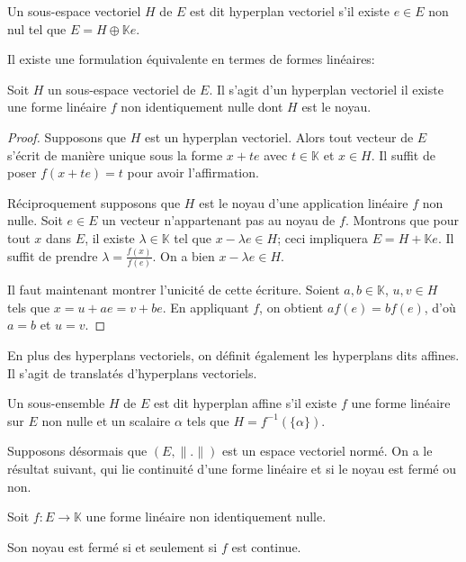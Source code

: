 \begin{df}
  Un sous-espace vectoriel $H$ de $E$ est dit hyperplan
  vectoriel s'il existe $e\in E$ non nul tel que
  $E = H\oplus \mathbb{K}e$.
\end{df}

Il existe une formulation équivalente en termes de formes linéaires:
\begin{prop}
  Soit $H$ un sous-espace vectoriel de $E$.
  Il s'agit d'un hyperplan vectoriel \ssi{} il existe une
  forme linéaire $f$ non identiquement nulle dont $H$ est
  le noyau.
\end{prop}

\begin{proof}
  Supposons que $H$ est un hyperplan vectoriel. Alors tout
  vecteur de $E$ s'écrit de manière unique sous la forme
  $x + te$ avec $t\in\mathbb{K}$ et $x\in H$.
  Il suffit de poser $f(x + te) = t$ pour avoir l'affirmation.

  Réciproquement supposons que $H$ est le noyau d'une application
  linéaire $f$ non nulle. Soit $e\in E$ un vecteur n'appartenant pas
  au noyau de $f$. Montrons que pour tout $x$ dans $E$, il existe
  $\lambda\in\mathbb{K}$ tel que $x-\lambda e\in H$;
  ceci impliquera $E = H + \mathbb{K}e$. Il suffit de prendre
  $\lambda = \frac{f(x)}{f(e)}$. On a bien $x-\lambda e\in H$.

  Il faut maintenant montrer l'unicité de cette écriture. Soient
  $a, b\in\mathbb{K}$, $u, v \in H$ tels que $x = u + ae = v+be$.
  En appliquant $f$, on obtient $af(e) = bf(e)$, d'où $a = b$
  et $u = v$.
\end{proof}

En plus des hyperplans vectoriels, on définit également les
hyperplans dits affines. Il s'agit de translatés d'hyperplans
vectoriels.
\begin{df}
  Un sous-ensemble $H$ de $E$ est dit hyperplan affine s'il
  existe $f$ une forme linéaire sur $E$ non nulle et un scalaire $\alpha$
  tels que $H = f^{-1}(\{\alpha\})$.
\end{df}

Supposons désormais que $(E, \|.\|)$ est un espace vectoriel
normé. On a le résultat suivant, qui lie continuité d'une
forme linéaire et si le noyau est fermé ou non.

\begin{prop}
  Soit $f: E \to\mathbb{K}$ une forme linéaire
  non identiquement nulle.

  Son noyau est fermé si et seulement si $f$ est continue.
\end{prop}

